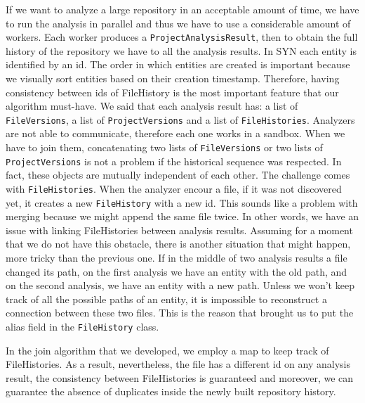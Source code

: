 \bigbreak
If we want to analyze a large repository in an acceptable amount of time, we have to run the analysis in parallel and thus we have to use a considerable amount of workers. 
Each worker produces a \texttt{ProjectAnalysisResult}, then to obtain the full history of the repository we have to all the analysis results. 
In SYN each entity is identified by an id. 
The order in which entities are created is important because we visually sort entities based on their creation timestamp. 
Therefore, having consistency between ids of FileHistory is the most important feature that our algorithm must-have.
We said that each analysis result has: a list of \texttt{FileVersions}, a list of \texttt{ProjectVersions} and a list of \texttt{FileHistories}. 
Analyzers are not able to communicate, therefore each one works in a sandbox. 
When we have to join them, concatenating two lists of \texttt{FileVersions} or two lists of \texttt{ProjectVersions} is not a problem if the historical sequence was respected. 
In fact, these objects are mutually independent of each other.
The challenge comes with \texttt{FileHistories}. When the analyzer encour a file, if it was not discovered yet, it creates a new \texttt{FileHistory} with a new id. 
This sounds like a problem with merging because we might append the same file twice. In other words, we have an issue with linking FileHistories between analysis results.
Assuming for a moment that we do not have this obstacle, there is another situation that might happen, more tricky than the previous one. 
If in the middle of two analysis results a file changed its path, on the first analysis we have an entity with the old path, 
and on the second analysis, we have an entity with a new path. 
Unless we won't keep track of all the possible paths of an entity, it is impossible to reconstruct a connection between these two files. 
This is the reason that brought us to put the alias field in the \texttt{FileHistory} class. 

In the join algorithm that we developed, we employ a map to keep track of FileHistories.
As a result, nevertheless, the file has a different id on any analysis result, the consistency between
FileHistories is guaranteed and moreover, we can guarantee the absence of duplicates inside the newly built repository history. 

